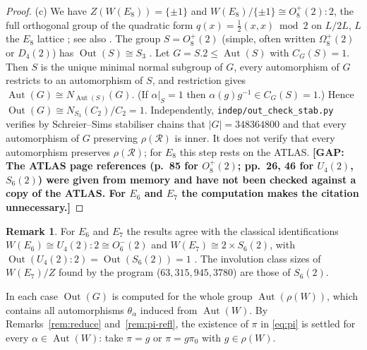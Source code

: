 \documentclass[11pt]{amsart}
\theoremstyle{definition}
\newtheorem{remark}[theorem]{Remark}
\newcommand{\R}{\mathcal{R}}
\newcommand{\Aut}{\operatorname{Aut}}
\newcommand{\Out}{\operatorname{Out}}
\newcommand{\GAP}[1]{\textbf{[GAP: #1]}}
\begin{document}
\begin{proof}
(c) We have $Z(W(E_8))=\{\pm1\}$ and $W(E_8)/\{\pm1\}\cong O_8^+(2){:}2$, the full orthogonal group of the
quadratic form $q(x)=\tfrac12(x,x)\bmod2$ on $L/2L$, $L$ the $E_8$ lattice \cite[p.~85]{ATLAS}; see also
\cite[\S2.12]{Hum90}. The group $S=O_8^+(2)$ (simple, often written $\Omega_8^+(2)$ or $D_4(2)$) has
$\Out(S)\cong S_3$ \cite[p.~85]{ATLAS}. Let $G=S.2\le\Aut(S)$ with $C_G(S)=1$. Then $S$ is the unique minimal
normal subgroup of $G$, every automorphism of $G$ restricts to an automorphism of $S$, and restriction gives
$\Aut(G)\cong N_{\Aut(S)}(G)$. (If $\alpha|_S=1$ then $\alpha(g)g^{-1}\in C_G(S)=1$.) Hence
$\Out(G)\cong N_{S_3}(C_2)/C_2=1$. Independently, \texttt{indep/out\_check\_stab.py} verifies by Schreier--Sims
stabiliser chains that $|G|=348364800$ and that every automorphism of $G$ preserving $\rho(\R)$ is inner. It does
not verify that every automorphism preserves $\rho(\R)$; for $E_8$ this step rests on the ATLAS.
\GAP{The ATLAS page references (p.~85 for $O_8^+(2)$; pp.~26, 46 for $U_4(2)$, $S_6(2)$) were given from memory
and have not been checked against a copy of the ATLAS. For $E_6$ and $E_7$ the computation makes the citation
unnecessary.}
\end{proof}

\begin{remark}
For $E_6$ and $E_7$ the results agree with the classical identifications
$W(E_6)\cong U_4(2){:}2\cong O_6^-(2)$ and $W(E_7)\cong 2\times S_6(2)$, with $\Out(U_4(2){:}2)=\Out(S_6(2))=1$
\cite{ATLAS}. The involution class sizes of $W(E_7)/Z$ found by the program ($63,315,945,3780$) are those of
$S_6(2)$.
\end{remark}

In each case $\Out(G)$ is computed for the whole group $\Aut(\rho(W))$, which contains all automorphisms
$\theta_\alpha$ induced from $\Aut(W)$. By Remarks~\ref{rem:reduce} and~\ref{rem:pi-refl}, the
existence of $\pi$ in \eqref{eq:pi} is settled for every $\alpha\in\Aut(W)$: take $\pi=g$ or $\pi=g\pi_0$ with
$g\in\rho(W)$.
\end{document}
